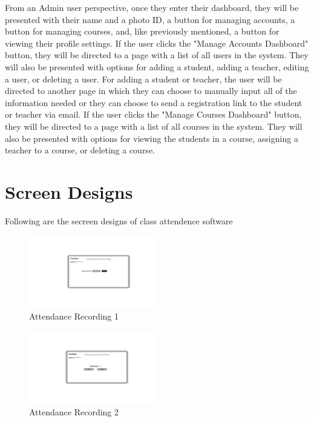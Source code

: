 \documentclass[letterpaper,12pt,oneside,listof=totoc]{scrreprt}
\begin{document}
From an Admin user perspective, once they enter their dashboard, they will be presented with their name and a photo ID, a button for managing accounts, a button for managing courses, and, like previously mentioned, a button for viewing their profile settings. If the user clicks the "Manage Accounts Dashboard" button, they will be directed to a page with a list of all users in the system. They will also be presented with options for adding a student, adding a teacher, editing a user, or deleting a user. For adding a student or teacher, the user will be directed to another page in which they can choose to manually input all of the information needed or they can choose to send a registration link to the student or teacher via email. If the user clicks the "Manage Courses Dashboard" button, they will be directed to a page with a list of all courses in the system. They will also be presented with options for viewing the students in a course, assigning a teacher to a course, or deleting a course.

\section{Screen Designs}


Following are the secreen designs of class attendence software




\begin{figure}[htbp]
  \centering
  \includegraphics[width=0.5\textwidth]{Attendence_recording.png}
  \caption{Attendance Recording 1}
\end{figure}

\begin{figure}[htbp]
  \centering
  \includegraphics[width=0.5\textwidth]{Attendence_recording2.png}
  \caption{Attendance Recording 2}
\end{figure}
\end{document}
